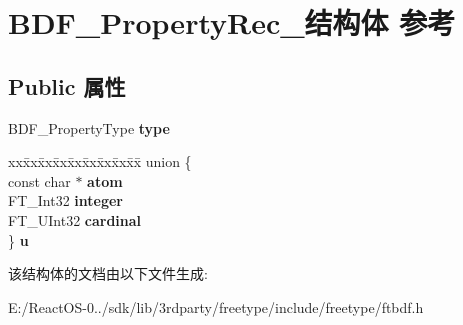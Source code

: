 \hypertarget{struct_b_d_f___property_rec__}{}\section{B\+D\+F\+\_\+\+Property\+Rec\+\_\+结构体 参考}
\label{struct_b_d_f___property_rec__}
\subsection*{Public 属性}
\begin{DoxyCompactItemize}
\item 
\mbox{\label{struct_b_d_f___property_rec___a88c19ee6f16bd1b36127f5f7d44a4e39}} 
B\+D\+F\+\_\+\+Property\+Type {\bfseries type}
\item 
\mbox{\label{struct_b_d_f___property_rec___a346b018bc82a0ff6cb17967f09effbb0}} 
\begin{tabbing}
xx\=xx\=xx\=xx\=xx\=xx\=xx\=xx\=xx\=\kill
union \{\\
\>const char $\ast$ {\bfseries atom}\\
\>FT\_Int32 {\bfseries integer}\\
\>FT\_UInt32 {\bfseries cardinal}\\
\} {\bfseries u}\\

\end{tabbing}\end{DoxyCompactItemize}


该结构体的文档由以下文件生成\+:\begin{DoxyCompactItemize}
\item 
E\+:/\+React\+O\+S-\/0../sdk/lib/3rdparty/freetype/include/freetype/ftbdf.\+h\end{DoxyCompactItemize}
